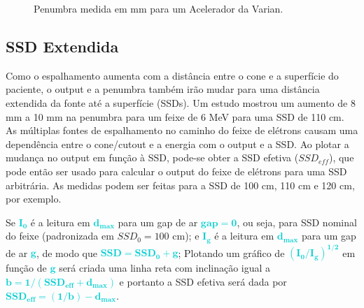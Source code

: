 \documentclass[11pt,a4paper]{article}
\newcounter{exemplo}
\begin{document}
	\begin{figure}[h]
		\centering
		\caption{Penumbra medida em mm para um Acelerador da Varian.}
		\label{fig:penumbraEletrons}
	\end{figure}

\subsection*{SSD Extendida}

	Como o espalhamento aumenta com a distância entre o cone e a superfície do paciente, o output e a penumbra também irão mudar para uma distância extendida da fonte até a superfície (SSDs). Um estudo mostrou um aumento de 8 mm a 10 mm na penumbra para um feixe de 6 MeV para uma SSD de 110 cm. As múltiplas fontes de espalhamento no caminho do feixe de elétrons causam uma dependência entre o  cone/cutout e a energia com o output e a SSD. Ao plotar a mudança no output em função à SSD, pode-se obter a SSD efetiva ($SSD_{eff}$), que pode então ser usado para calcular o output do feixe de elétrons para uma SSD arbitrária. As medidas podem ser feitas para a SSD de 100 cm, 110 cm e 120 cm, por exemplo. 


	\begin{tcolorbox}[width=\textwidth, colback={white}, colbacktitle={DarkTurquoise!50!white}, title={$\bigstar$ \LobsterTwo{Determinação da $\mathbf{SSD_{eff}}$} $\bigstar $}, coltitle={CarnationPink}, colframe={DarkTurquoise}, fonttitle=\rmfamily\bfseries\Large]

		Se \textcolor{DarkTurquoise}{$\mathbf{I_0}$} é a leitura em \textcolor{DarkTurquoise}{$\mathbf{d_{max}}$} para um gap de ar \textcolor{DarkTurquoise}{$\mathbf{gap = 0}$}, ou seja, para SSD nominal do feixe (padronizada em $SSD_0 = 100$ cm); e \textcolor{DarkTurquoise}{$\mathbf{I_g}$} é a leitura em \textcolor{DarkTurquoise}{$\mathbf{d_{max}}$} para um gap de ar \textcolor{DarkTurquoise}{$\mathbf{g}$}, de modo que \textcolor{DarkTurquoise}{$\mathbf{SSD = SSD_0 + g}$}; Plotando um gráfico de \textcolor{DarkTurquoise}{$\mathbf{\left(I_0 / I_g\right)^{1/2}}$} em função de \textcolor{DarkTurquoise}{$\mathbf{g}$} será criada uma linha reta com inclinação igual a \textcolor{DarkTurquoise}{$\mathbf{b = 1 / (SSD_{eff} + d_{max})}$} e portanto a SSD efetiva será dada por \textcolor{DarkTurquoise}{$\mathbf{SSD_{eff} = (1/b) - d_{max}}$}.

	\end{tcolorbox}
\end{document}
